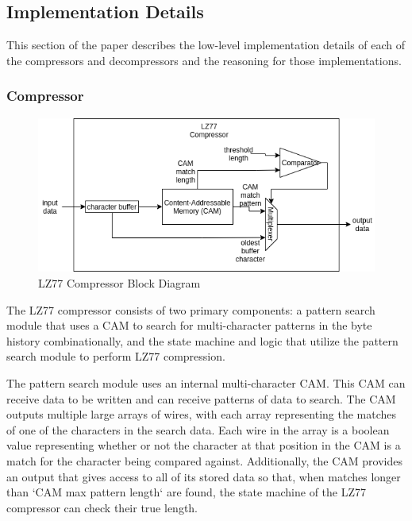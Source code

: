\documentclass[doublespace,nopageskip]{VTthesis}
\begin{document}
\subsection{Implementation Details}\label{se:lz77_implementation_details}
This section of the paper describes the low-level implementation details of each of the compressors and decompressors and the reasoning for those implementations.

\subsubsection{Compressor}\label{sss:lz77_compressor_implementation}

\begin{figure}[htb]
	\centering
	\includegraphics[scale=0.8]{LZ77 Compressor.png}
	\caption{LZ77 Compressor Block Diagram}
	\label{fig:lz77_compressor_block_diagram}
\end{figure}

The LZ77 compressor consists of two primary components: a pattern search module that uses a CAM to search for multi-character patterns in the byte history combinationally, and the state machine and logic that utilize the pattern search module to perform LZ77 compression.

The pattern search module uses an internal multi-character CAM. This CAM can receive data to be written and can receive patterns of data to search. The CAM outputs multiple large arrays of wires, with each array representing the matches of one of the characters in the search data. Each wire in the array is a boolean value representing whether or not the character at that position in the CAM is a match for the character being compared against. Additionally, the CAM provides an output that gives access to all of its stored data so that, when matches longer than `CAM max pattern length` are found, the state machine of the LZ77 compressor can check their true length.
\end{document}
